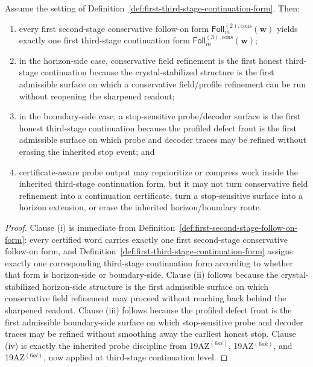 \begin{proposition}
\label{prop:every-first-second-stage-conservative-bifurcation-yields-exactly-one-first-third-stage-continuation-form}
Assume the setting of Definition~\ref{def:first-third-stage-continuation-form}. Then:
\begin{enumerate}[label=(\roman*)]
  \item every first second-stage conservative follow-on form \(\mathsf{Foll}^{(2),\mathrm{cons}}_{m}(\mathbf w)\) yields exactly one first third-stage continuation form \(\mathsf{Foll}^{(3),\mathrm{cons}}_{m}(\mathbf w)\);
  \item in the horizon-side case, conservative field refinement is the first honest third-stage continuation because the crystal-stabilized structure is the first admissible surface on which a conservative field/profile refinement can be run without reopening the sharpened readout;
  \item in the boundary-side case, a stop-sensitive probe/decoder surface is the first honest third-stage continuation because the profiled defect front is the first admissible surface on which probe and decoder traces may be refined without erasing the inherited stop event; and
  \item certificate-aware probe output may reprioritize or compress work inside the inherited third-stage continuation form, but it may not turn conservative field refinement into a continuation certificate, turn a stop-sensitive surface into a horizon extension, or erase the inherited horizon/boundary route.
\end{enumerate}
\end{proposition}

\begin{proof}
Clause (i) is immediate from Definition~\ref{def:first-second-stage-follow-on-form}: every certified word carries exactly one first second-stage conservative follow-on form, and Definition~\ref{def:first-third-stage-continuation-form} assigns exactly one corresponding third-stage continuation form according to whether that form is horizon-side or boundary-side. Clause (ii) follows because the crystal-stabilized horizon-side structure is the first admissible surface on which conservative field refinement may proceed without reaching back behind the sharpened readout. Clause (iii) follows because the profiled defect front is the first admissible boundary-side surface on which stop-sensitive probe and decoder traces may be refined without smoothing away the earliest honest stop. Clause (iv) is exactly the inherited probe discipline from 19AZ$^{(6ai)}$, 19AZ$^{(6ak)}$, and 19AZ$^{(6al)}$, now applied at third-stage continuation level.
\end{proof}

